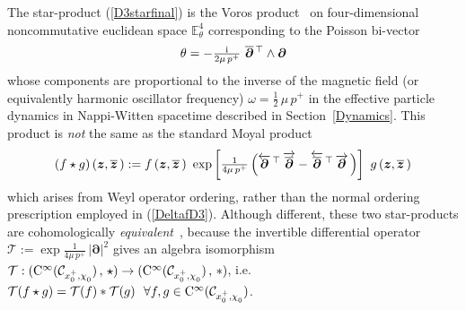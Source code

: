 \documentclass[11pt,a4paper]{article}
\newcommand{\ii}{{\rm i}}
\newcommand{\mbf}[1]{{\boldsymbol {#1} }}
\def\ii{{\,{\rm i}\,}}
\def\mz{{\mbf z}}
\def\mdell{{\mbf\partial}}
\newcommand{\eucl}{{\mathbb E}}
\newcommand{\beq}{\begin{eqnarray}}
\newcommand{\eeq}{\end{eqnarray}}
\begin{document}
The star-product (\ref{D3starfinal}) is the Voros
product~\cite{Voros1} on four-dimensional noncommutative euclidean
space $\eucl_\theta^4$ corresponding to the Poisson bi-vector
\beq
\theta=-\mbox{$\frac\ii{2\mu\,p^+}$}~\overline{\mdell}{}^{\,\top}
\wedge\mdell
\label{NCparD3}\eeq
whose components are proportional to the inverse of the magnetic field (or
equivalently harmonic oscillator frequency)
$\omega=\frac12\,\mu\,p^+$ in the effective particle dynamics in
Nappi-Witten spacetime described in Section~\ref{Dynamics}. This
product is {\it not} the same as the standard Moyal product
\beq
(f\star g)\left(\mz,\overline{\mz}\,\right):=f\left(\mz,
\overline{\mz}\,\right)~\exp\left[\mbox{$\frac1{4\mu\,p^+}$}\,
\Bigl(\overleftarrow{\mdell}{}^{\,\top}\,\overrightarrow{\overline{\mdell}}
-\overleftarrow{\overline{\mdell}}{}^{\,\top}\,
\overrightarrow{\mdell}\,\Bigr)\right]~g\left(\mz,\overline{\mz}\,\right)
\label{MoyalD3def}\eeq
which arises from Weyl operator ordering, rather than the normal
ordering prescription employed in (\ref{DeltafD3}). Although
different, these two star-products are cohomologically {\it
  equivalent}~\cite{Voros1}, because the invertible differential
operator $\mathcal{T}:=\exp\frac1{4\mu\,p^+}\,|\mdell|^2$ gives an
algebra isomorphism $\mathcal{T}:({\rm
  C}^\infty(\mathcal{C}_{x_0^+,\chi^{~}_0})\,,\,\star)\to({\rm
  C}^\infty(\mathcal{C}_{x_0^+,\chi^{~}_0})\,,\,*)$,
i.e. $\mathcal{T}(f\star g)=\mathcal{T}(f)*\mathcal{T}(g)~~\forall
f,g\in{\rm C}^\infty(\mathcal{C}_{x_0^+,\chi^{~}_0})$.
\end{document}
